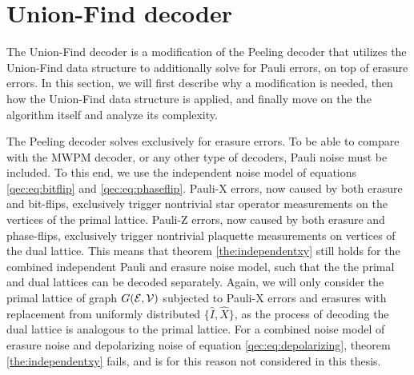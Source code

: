 \section{Union-Find decoder}\label{sec:ufdecoder}
The Union-Find decoder \cite{delfosse2017almost} is a modification of the Peeling decoder that utilizes the Union-Find data structure \cite{tarjan1975efficiency} to additionally solve for Pauli errors, on top of erasure errors. In this section, we will first describe why a modification is needed, then how the Union-Find data structure is applied, and finally move on the the algorithm itself and analyze its complexity.

The Peeling decoder solves exclusively for erasure errors. To be able to compare with the MWPM decoder, or any other type of decoders, Pauli noise must be included. To this end, we use the independent noise model of equations \eqref{qec:eq:bitflip} and \eqref{qec:eq:phaseflip}. Pauli-X errors, now caused by both erasure and bit-flips, exclusively trigger nontrivial star operator measurements on the vertices of the primal lattice. Pauli-Z errors, now caused by both erasure and phase-flips, exclusively trigger nontrivial plaquette measurements on vertices of the dual lattice. This means that theorem \ref{the:independentxy} still holds for the combined independent Pauli and erasure noise model, such that the the primal and dual lattices can be decoded separately. Again, we will only consider the primal lattice of graph $G(\mathcal{E},\mathcal{V})$ subjected to Pauli-X errors and erasures with replacement from uniformly distributed $\{\hat{I}, \hat{X}\}$, as the process of decoding the dual lattice is analogous to the primal lattice. For a combined noise model of erasure noise and depolarizing noise of equation \eqref{qec:eq:depolarizing}, theorem \ref{the:independentxy} fails, and is for this reason not considered in this thesis.

